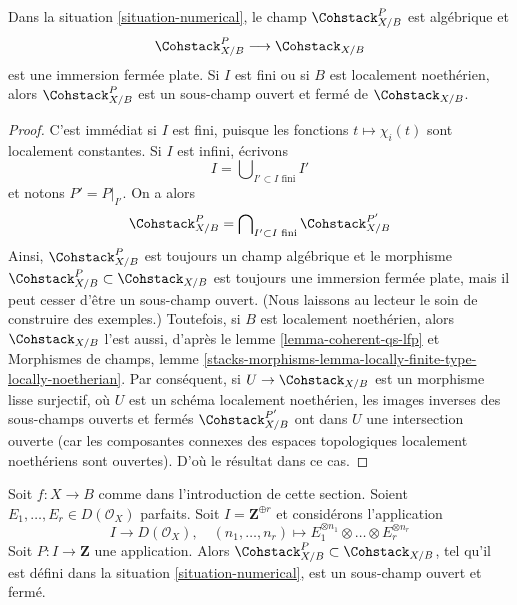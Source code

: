 \begin{lemma}
\label{lemma-open-P}
Dans la situation \ref{situation-numerical}, le champ
$\Cohstack^P_{X/B}$ est algébrique et
$$
\Cohstack^P_{X/B} \longrightarrow \Cohstack_{X/B}
$$
est une immersion fermée plate. Si $I$ est fini ou si $B$ est localement
noethérien, alors $\Cohstack^P_{X/B}$ est un sous-champ ouvert et fermé de
$\Cohstack_{X/B}$.
\end{lemma}

\begin{proof}
C'est immédiat si $I$ est fini, puisque les fonctions
$t \mapsto \chi_i(t)$ sont localement constantes. Si $I$ est infini,
écrivons
$$
I = \bigcup\nolimits_{I' \subset I\text{ fini}} I'
$$
et notons $P' = P|_{I'}$. On a alors
$$
\Cohstack^P_{X/B} = \bigcap\nolimits_{I' \subset I\text{ fini}}
\Cohstack^{P'}_{X/B}
$$
Ainsi, $\Cohstack^P_{X/B}$ est toujours un champ algébrique et le morphisme
$\Cohstack^P_{X/B} \subset \Cohstack_{X/B}$ est toujours une immersion
fermée plate, mais il peut cesser d'être un sous-champ ouvert. (Nous
laissons au lecteur le soin de construire des exemples.) Toutefois, si
$B$ est localement noethérien, alors $\Cohstack_{X/B}$ l'est aussi, d'après
le lemme \ref{lemma-coherent-qs-lfp} et Morphismes de champs, lemme
\ref{stacks-morphisms-lemma-locally-finite-type-locally-noetherian}.
Par conséquent, si $U \to \Cohstack_{X/B}$ est un morphisme lisse
surjectif, où $U$ est un schéma localement noethérien, les images inverses
des sous-champs ouverts et fermés $\Cohstack^{P'}_{X/B}$ ont dans $U$ une
intersection ouverte (car les composantes connexes des espaces topologiques
localement noethériens sont ouvertes).
D'où le résultat dans ce cas.
\end{proof}

\begin{lemma}
\label{lemma-finite-list-perfect-objects}
Soit $f : X \to B$ comme dans l'introduction de cette section.
Soient $E_1, \ldots, E_r \in D(\mathcal{O}_X)$ parfaits.
Soit $I = \mathbf{Z}^{\oplus r}$ et considérons l'application
$$
I \longrightarrow D(\mathcal{O}_X),\quad
(n_1, \ldots, n_r) \longmapsto
E_1^{\otimes n_1}
\otimes \ldots \otimes
E_r^{\otimes n_r}
$$
Soit $P : I \to \mathbf{Z}$ une application. Alors
$\Cohstack^P_{X/B} \subset \Cohstack_{X/B}$,
tel qu'il est défini dans la situation \ref{situation-numerical}, est un
sous-champ ouvert et fermé.
\end{lemma}

